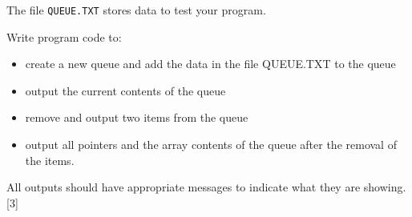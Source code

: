 The file \texttt{QUEUE.TXT} stores data to test your program.

Write program code to:
\begin{itemize}
\item create a new queue and add the data in the file QUEUE.TXT to the queue 
\item output the current contents of the queue
\item remove and output two items from the queue 
\item output all pointers and the array contents of the queue after the
removal of the items.
\end{itemize}
All outputs should have appropriate messages to indicate what they
are showing. \hfill{}{[}3{]}